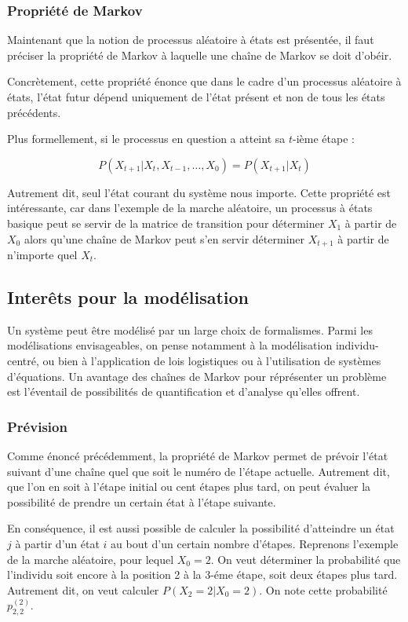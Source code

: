 \documentclass[12pt]{article}
\begin{document}
\subsubsection{Propriété de Markov}

Maintenant que la notion de processus aléatoire à états est présentée,
il faut préciser la propriété de Markov à laquelle une chaîne de
Markov se doit d'obéir.

Concrètement, cette propriété énonce que dans le cadre d'un processus
aléatoire à états, l'état futur dépend uniquement de l'état présent et
non de tous les états précédents.

Plus formellement, si le processus en question a atteint sa $t$-ième étape
:

$$
P(X_{t+1} | X_{t}, X_{t-1}, \dots, X_0) = P(X_{t+1} | X_t)
$$

Autrement dit, seul l'état courant du système nous importe. Cette
propriété est intéressante, car dans l'exemple de la marche aléatoire,
un processus à états basique peut se servir de la matrice de
transition pour déterminer $X_1$ à partir de $X_0$ alors qu'une chaîne
de Markov peut s'en servir déterminer $X_{t+1}$ à partir de n'importe
quel $X_t$.

\subsection{Interêts pour la modélisation}

Un système peut être modélisé par un large choix de formalismes. Parmi
les modélisations envisageables, on pense notamment à la modélisation
individu-centré, ou bien à l'application de lois logistiques ou à
l'utilisation de systèmes d'équations. Un avantage des chaînes de
Markov pour réprésenter un problème est l'éventail de possibilités de
quantification et d'analyse qu'elles offrent.

\subsubsection{Prévision}

Comme énoncé précédemment, la propriété de Markov permet de prévoir
l'état suivant d'une chaîne quel que soit le numéro de l'étape
actuelle. Autrement dit, que l'on en soit à l'étape initial ou cent
étapes plus tard, on peut évaluer la possibilité de prendre un certain
état à l'étape suivante.

En conséquence, il est aussi possible de calculer la possibilité
d'atteindre un état $j$ à partir d'un état $i$ au bout d'un certain
nombre d'étapes. Reprenons l'exemple de la marche aléatoire, pour
lequel $X_0 = 2$. On veut déterminer la probabilité que l'individu
soit encore à la position 2 à la 3-éme étape, soit deux étapes plus
tard. Autrement dit, on veut calculer $P(X_2 = 2 | X_0 = 2)$. On note
cette probabilité $p^{(2)}_{2,2}$.
\end{document}
